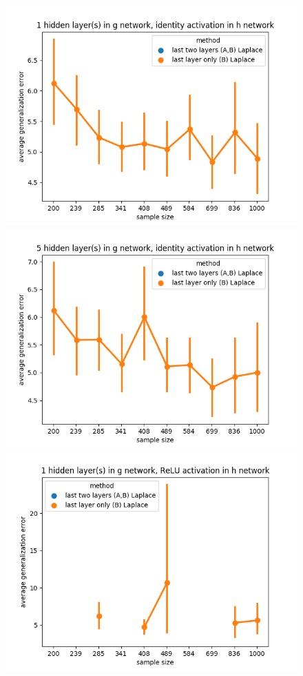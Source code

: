 \documentclass{article} %
\begin{document}
\begin{figure}[t!]
	\begin{center}
		\includegraphics[scale=0.35]{laplace_taskid4.png}
		\includegraphics[scale=0.35]{laplace_taskid5.png}
		\includegraphics[scale=0.35]{laplace_taskid6.png}

\end{center}
\end{figure}
\end{document}
